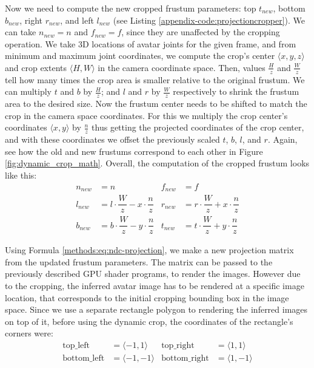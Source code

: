 Now we need to compute the new cropped frustum parameters: top $t_{new}$, bottom $b_{new}$, right $r_{new}$, and left $l_{new}$ (see Listing \ref{appendix-code:projectioncropper}). We can take $n_{new} = n$ and $f_{new} = f$, since they are unaffected by the cropping operation. We take 3D locations of avatar joints for the given frame, and from minimum and maximum joint coordinates, we compute the crop's center $\langle x, y, z\rangle$ and crop extents $\langle H, W \rangle$ in the camera coordinate space. Then, values $\tfrac{H}{z}$ and $\tfrac{W}{z}$ tell how many times the crop area is smaller relative to the original frustum. We can multiply $t$ and $b$ by $\tfrac{H}{z}$; and $l$ and $r$ by $\tfrac{W}{z}$ respectively to shrink the frustum area to the desired size. Now the frustum center needs to be shifted to match the crop in the camera space coordinates. For this we multiply the crop center's coordinates $\langle x, y \rangle$  by $\tfrac{n}{z}$ thus getting the projected coordinates of the crop center, and with these coordinates we offset the previously scaled $t$, $b$, $l$, and $r$. Again, see how the old and new frustums correspond to each other in Figure \ref{fig:dynamic_crop_math}. Overall, the computation of the cropped frustum looks like this:
\begin{align}
	n_{new} &= n & f_{new} &= f \\
	l_{new} &= l\cdot\dfrac{W}{z} - x\cdot \dfrac{n}{z} & r_{new} &= r\cdot\dfrac{W}{z} + x\cdot \dfrac{n}{z} \\
	b_{new} &= b\cdot\dfrac{W}{z} - y\cdot \dfrac{n}{z} & t_{new} &= t\cdot\dfrac{W}{z} + y\cdot \dfrac{n}{z} \label{methods:eq:frustum-new-parameters}
\end{align}

Using Formula \ref{methods:eq:ndc-projection}, we make a new projection matrix from the updated frustum parameters. The matrix can be passed to the previously described GPU shader programs, to render the images. However due to the cropping, the inferred avatar image has to be rendered at a specific image location, that corresponds to the initial cropping bounding box in the image space. Since we use a separate rectangle polygon to rendering the inferred images on top of it, before using the dynamic crop, the coordinates of the rectangle's corners were:
	\begin{align}
		\text{top{\_}left} &= \langle -1, 1 \rangle & \text{top{\_}right} &= \langle 1, 1 \rangle \\
		\text{bottom{\_}left} &= \langle -1, -1 \rangle & \text{bottom{\_}right} &= \langle 1, -1 \rangle
	\end{align}

